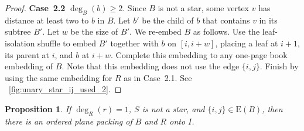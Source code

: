 \documentclass[11pt,a4paper,colorlinks=true,urlcolor=blue,citecolor=red]{article}
\theoremstyle{plain}
\newtheorem{proposition}[theorem]{Proposition}
\newcommand{\case}[1]{\par\vspace{.5\baselineskip}\noindent\textbf{\sffamily Case~#1}}
\newcommand{\EB}{\mathrm{E}(B)}
\begin{document}
\begin{proof}
  \case{2.2} $\deg_{B}(b)\geq 2$. Since $B$ is not a star,
  some vertex $v$ has distance at least two to $b$ in $B$. Let $b'$
  be the child of $b$ that contains $v$ in its subtree $B'$. Let $w$ be
  the size of $B'$. We re-embed $B$ as follows. Use the
  leaf-isolation shuffle to embed $B'$ together with $b$ on $[i,i+w]$,
  placing a leaf at $i+1$, its parent at $i$, and $b$ at $i+w$. Complete
  this embedding to any one-page book embedding of $B$. Note that
  this embedding does not use the edge $\{i,j\}$. Finish by using the
  same embedding for $R$ as in Case~2.1. See
  \figurename~\ref{fig:unary_star_ij_used_2}.
\end{proof}

\begin{proposition}\label{prop:rec_unary_regular_ij_used}
  If $\deg_R(r)=1$, $S$ is not a star, and $\{i,j\}\in\EB$,
  then there is an ordered plane packing of $B$ and $R$ onto $I$.
\end{proposition}
\end{document}
